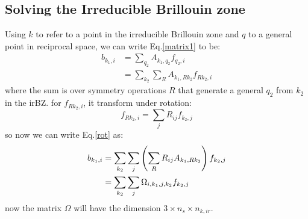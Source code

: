 \documentclass{article}
\begin{document}
\subsection{Solving the Irreducible Brillouin zone}
Using $k$ to refer to a point in the irreducible Brillouin zone and $q$ to a general point in reciprocal space, 
we can write Eq.\ref{matrix1} to be:
\begin{align}
    b_{k_1,i} &= \sum_{q_2} A_{k_1,q_2} f_{q_2,i} \\
              &= \sum_{k_2} \sum_R A_{k_1,Rk_2} f_{Rk_2,i} \label{rot}
\end{align}
where the sum is over symmetry operations $R$ that generate a general $q_2$ from $k_2$ in the irBZ. 
for $f_{Rk_2,i}$, it transform under rotation:
\begin{equation}
    f_{Rk_2,i} = \sum_j R_{ij} f_{k_2,j}
\end{equation}
so now we can write Eq.\ref{rot} as:
\begin{align}
    b_{k_1,i} &= \sum_{k_2} \sum_j \left( \sum_R R_{ij} A_{k_1,Rk_2} \right) f_{k_2,j} \notag \\
              &= \sum_{k_2} \sum_j \Omega_{i,k_1,j,k_2} f_{k_2,j} 
\end{align}
now the matrix $\Omega$ will have the dimension $3 \times n_s \times n_{k,ir}$.
\end{document}
